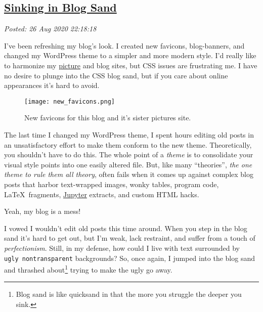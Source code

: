 %

\subsection*{\href{http://analyzethedatanotthedrivel.org/2020/08/26/sinking-in-blog-sand/}{Sinking in Blog Sand}}


\noindent\emph{Posted: 26 Aug 2020 22:18:18}
\vspace{6pt}

I've been refreshing my blog's look. I created new favicons,
blog-banners, and changed my WordPress theme to a simpler and more
modern style. I'd really like to harmonize my
\href{https://conceptcontrol.smugmug.com/}{picture} and blog sites, but
CSS issues are frustrating me. I have no desire to plunge into the CSS
blog sand, but if you care about online appearances it's hard to avoid.

\captionsetup[figure]{labelformat=empty}
\begin{figure}[htbp]
\centering
\texttt{[image: new\_favicons.png]}
\caption{New favicons for this blog and it’s sister pictures site.}
\label{fig:6613x0}
\end{figure}


The last time I changed my WordPress theme, I spent hours editing old
posts in an unsatisfactory effort to make them conform to the new theme.
Theoretically, you shouldn't have to do this. The whole point of a
\emph{theme} is to consolidate your visual style points into one easily
altered file. But, like many ``theories'', \emph{the one theme to rule
them all theory}, often fails when it comes up against complex blog
posts that harbor text-wrapped images, wonky tables, program code, \LaTeX\
fragments, \href{https://jupyter.org/}{Jupyter} extracts, and custom
HTML hacks.

Yeah, my blog is a mess!

I vowed I wouldn't edit old posts this time around. When you step in the
blog sand it's hard to get out, but I'm weak, lack restraint, and suffer
from a touch of \emph{perfectionism}. Still, in my defense, how could I
live with text surrounded by \texttt{ugly\ nontransparent} backgrounds?
So, once again, I jumped into the blog sand and thrashed
about\footnote{Blog sand is like quicksand in that the more you struggle the deeper
  you sink.}  trying to make the %
ugly go away.

